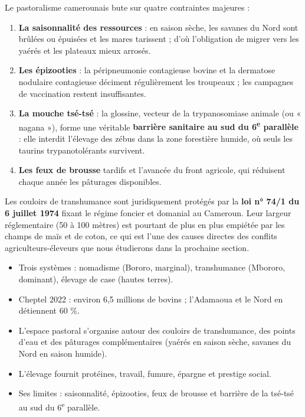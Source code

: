 \documentclass[11pt]{article}
\newcommand{\cle}[1]{{\popxbold\color{popdark}#1}}
\begin{document}
Le pastoralisme camerounais bute sur quatre contraintes majeures :
\begin{enumerate}
\item \textbf{La saisonnalité des ressources} : en saison sèche, les savanes du Nord sont brûlées ou épuisées et les mares tarissent ; d'où l'obligation de migrer vers les yaérés et les plateaux mieux arrosés.
\item \textbf{Les épizooties} : la \cle{péripneumonie contagieuse bovine} et la \cle{dermatose nodulaire contagieuse} déciment régulièrement les troupeaux ; les campagnes de vaccination restent insuffisantes.
\item \textbf{La mouche tsé-tsé} : la glossine, vecteur de la trypanosomiase animale (ou « nagana »), forme une véritable \textbf{barrière sanitaire au sud du 6\textsuperscript{e} parallèle} : elle interdit l'élevage des zébus dans la zone forestière humide, où seuls les taurins trypanotolérants survivent.
\item \textbf{Les feux de brousse} tardifs et l'avancée du front agricole, qui réduisent chaque année les pâturages disponibles.
\end{enumerate}

\begin{savaistu}
Les couloirs de transhumance sont juridiquement protégés par la \textbf{loi n° 74/1 du 6 juillet 1974} fixant le régime foncier et domanial au Cameroun. Leur largeur réglementaire (50 à 100 mètres) est pourtant de plus en plus empiétée par les champs de maïs et de coton, ce qui est l'une des causes directes des conflits agriculteurs-éleveurs que nous étudierons dans la prochaine section.
\end{savaistu}

\begin{aretenir}
\begin{itemize}
\item Trois systèmes : nomadisme (Bororo, marginal), transhumance (Mbororo, dominant), élevage de case (hautes terres).
\item Cheptel 2022 : environ 6,5 millions de bovins ; l'Adamaoua et le Nord en détiennent 60 \%.
\item L'espace pastoral s'organise autour des couloirs de transhumance, des points d'eau et des pâturages complémentaires (yaérés en saison sèche, savanes du Nord en saison humide).
\item L'élevage fournit protéines, travail, fumure, épargne et prestige social.
\item Ses limites : saisonnalité, épizooties, feux de brousse et barrière de la tsé-tsé au sud du 6\textsuperscript{e} parallèle.
\end{itemize}
\end{aretenir}
\end{document}
